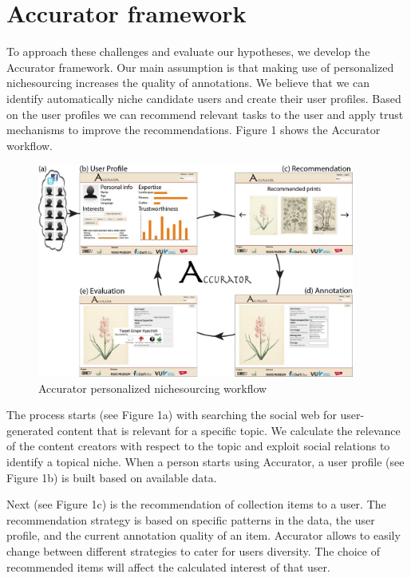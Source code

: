 \section{Accurator framework}
\label{architecture}
To approach these challenges and evaluate our hypotheses, we develop the Accurator framework. Our main assumption is that making use of personalized nichesourcing increases the quality of annotations. We believe that we can identify automatically niche candidate users and create their user profiles. Based on the user profiles we can recommend relevant tasks to the user and apply trust mechanisms to improve the recommendations. Figure 1 shows the Accurator workflow. 

\begin{figure}[hbt]
	\centering
	\includegraphics[width=0.93\textwidth]{accurator_diagram.jpg}
  	\caption{Accurator personalized nichesourcing workflow}
\end{figure}

The process starts (see Figure 1a) with searching the social web for user-generated content that is relevant for a specific topic. We calculate the relevance of the content creators with respect to the topic and exploit social relations to identify a topical niche. When a person starts using Accurator, a user profile (see Figure 1b) is built based on available data.

Next (see Figure 1c) is the recommendation of collection items to a user. The recommendation strategy is based on specific patterns in the data, the user profile, and the current annotation quality of an item. Accurator allows to easily change between different strategies to cater for users diversity.
The choice of recommended items will affect the calculated interest of that user.

